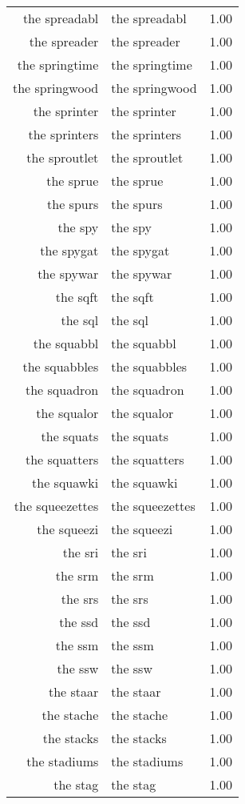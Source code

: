 \begin{table}[ht]
\begin{tabular}{rlr}
  the spreadabl & the spreadabl & 1.00 \\ 
  the spreader & the spreader & 1.00 \\ 
  the springtime & the springtime & 1.00 \\ 
  the springwood & the springwood & 1.00 \\ 
  the sprinter & the sprinter & 1.00 \\ 
  the sprinters & the sprinters & 1.00 \\ 
  the sproutlet & the sproutlet & 1.00 \\ 
  the sprue & the sprue & 1.00 \\ 
  the spurs & the spurs & 1.00 \\ 
  the spy & the spy & 1.00 \\ 
  the spygat & the spygat & 1.00 \\ 
  the spywar & the spywar & 1.00 \\ 
  the sqft & the sqft & 1.00 \\ 
  the sql & the sql & 1.00 \\ 
  the squabbl & the squabbl & 1.00 \\ 
  the squabbles & the squabbles & 1.00 \\ 
  the squadron & the squadron & 1.00 \\ 
  the squalor & the squalor & 1.00 \\ 
  the squats & the squats & 1.00 \\ 
  the squatters & the squatters & 1.00 \\ 
  the squawki & the squawki & 1.00 \\ 
  the squeezettes & the squeezettes & 1.00 \\ 
  the squeezi & the squeezi & 1.00 \\ 
  the sri & the sri & 1.00 \\ 
  the srm & the srm & 1.00 \\ 
  the srs & the srs & 1.00 \\ 
  the ssd & the ssd & 1.00 \\ 
  the ssm & the ssm & 1.00 \\ 
  the ssw & the ssw & 1.00 \\ 
  the staar & the staar & 1.00 \\ 
  the stache & the stache & 1.00 \\ 
  the stacks & the stacks & 1.00 \\ 
  the stadiums & the stadiums & 1.00 \\ 
  the stag & the stag & 1.00 \\ 

\end{tabular}
\end{table}

